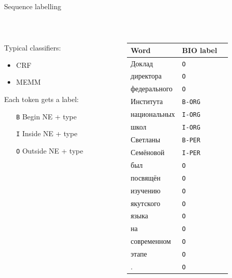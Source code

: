 \documentclass[10pt, compress]{beamer}
\begin{document}
\begin{frame}{Sequence labelling}

~\\

\begin{columns}
\begin{column}{0.48\textwidth}
Typical classifiers:
\begin{itemize}
\item CRF
\item MEMM
\end{itemize}

Each token gets a label:
\begin{itemize}
\item [{\tt B}] Begin NE + type
\item [{\tt I}] Inside NE + type
\item [{\tt O}] Outside NE + type
\end{itemize}
\end{column}
\begin{column}{0.48\textwidth}
{\small 
\begin{tabular}{lll}
\textbf{Word} & \textbf{BIO label} \\
\hline
Доклад & {\tt O} \\
директора & {\tt O} \\
федерального & {\tt O} \\
Института & {\tt B-ORG} \\
национальных & {\tt I-ORG} \\
школ & {\tt I-ORG} \\
Светланы & {\tt B-PER} \\
Семёновой & {\tt I-PER} \\
был & {\tt O} \\
посвящён & {\tt O} \\
изучению & {\tt O} \\
якутского & {\tt O} \\
языка & {\tt O} \\
на & {\tt O} \\
современном & {\tt O} \\
этапе & {\tt O} \\
. & {\tt O} \\
\end{tabular}
}
\end{column}

\end{columns}
\end{frame}

\end{document}
